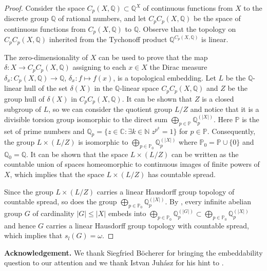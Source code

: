 \documentclass[11pt, twoside]{amsart}
\theoremstyle{definition}
\begin{document}
\begin{proof} Consider the space $C_p(X,{\mathbb Q})\subset{\mathbb Q}^X$ of continuous functions from $X$ to the discrete group ${\mathbb Q}$ of rational numbers, and let $C_pC_p(X,{\mathbb Q})$ be the space of continuous functions from $C_p(X,{\mathbb Q})$ to ${\mathbb Q}$. Observe that the topology on $C_pC_p(X,{\mathbb Q})$ inherited from the Tychonoff product ${\mathbb Q}^{C_p(X,{\mathbb Q})}$ is linear.

The zero-dimensionality of $X$ can be used to prove that the map $\delta:X\to C_pC_p(X,{\mathbb Q})$ assigning to each $x\in X$ the Dirac measure $\delta_x:C_p(X,{\mathbb Q})\to{\mathbb Q}$, $\delta_x:f\mapsto f(x)$, is a topological embedding. Let $L$ be the ${\mathbb Q}$-linear hull of the set $\delta(X)$ in the ${\mathbb Q}$-linear space $C_pC_p(X,{\mathbb Q})$ and $Z$ be the group hull of $\delta(X)$ in $C_pC_p(X,{\mathbb Q})$. It can be shown that $Z$ is a closed subgroup of $L$, so we can consider the quotient group $L/Z$ and notice that it is a divisible torsion group isomorphic to the direct sum $\bigoplus_{p\in{\mathbb P}}{\mathbb Q}_p^{(|X|)}$. Here ${\mathbb P}$ is the set of prime numbers and ${\mathbb Q}_p=\{z\in{\mathbb C}:\exists k\in{\mathbb N} \;z^{p^k}=1\}$ for $p\in{\mathbb P}$. Consequently, the  group $L\times (L/Z)$ is isomorphic to $\bigoplus_{p\in{\mathbb P}_0}{\mathbb Q}_p^{(|X|)}$ where ${\mathbb P}_0={\mathbb P}\cup\{0\}$ and ${\mathbb Q}_0={\mathbb Q}$. It can be shown that the space $L\times (L/Z)$ can be written as the countable union of spaces homeomorphic to continuous images of finite powers of $X$, which implies that the space $L\times(L/Z)$ has countable spread.

Since the group $L\times (L/Z)$ carries a linear Hausdorff group topology of countable spread, so does the group $\bigoplus_{p\in{\mathbb P}_0}{\mathbb Q}_p^{(|X|)}$. By \cite[4.1.5 and 4.1.6]{Rob}, every infinite abelian group $G$ of cardinality $|G|\le |X|$ embeds into $\bigoplus_{p\in{\mathbb P}_0}{\mathbb Q}_p^{(|G|)}\subset\bigoplus_{p\in{\mathbb P}_0}{\mathbb Q}_p^{(|X|)}$ and hence $G$ carries a linear Hausdorff group topology with countable spread, which implies that $s_l(G)={\omega}$.
\end{proof}

 

{\bf Acknowledgement.} We thank Siegfried B\"ocherer for bringing the embeddability question to our attention and we thank Istvan Juh\'asz for his hint to
\cite{Juh02}.

\newpage
\end{document}
